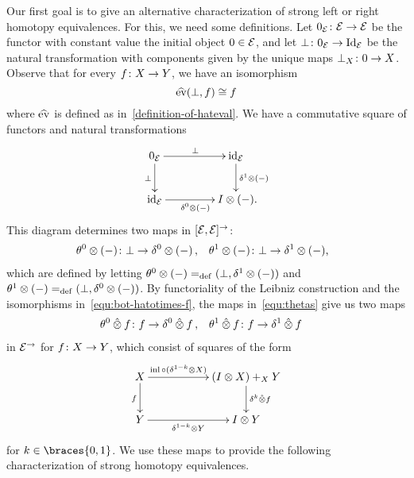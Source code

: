 \documentclass[reqno,10pt,a4paper,oneside,draft]{amsart}
\begin{document}
Our first goal is to give an alternative characterization of strong left or right homotopy equivalences.
For this, we need some definitions.
Let $0_{\mathcal{E}} \colon \mathcal{E} \to \mathcal{E}$ be the functor with constant value the initial object $0 \in \mathcal{E}$, and let $\bot \colon 0_{\mathcal{E}} \rightarrow \operatorname{Id}_{\mathcal{E}}$ be the natural transformation with components given by the unique maps $\bot_X \colon 0 \to X$.
Observe that for every $f \colon X \to Y$, we have an isomorphism
\begin{equation} \label{equ:bot-hatotimes-f}
\widehat{\operatorname{ev}}(\bot, f) \cong f
\end{equation}
where $\widehat{\operatorname{ev}}$ is defined as in~\eqref{definition-of-hateval}.
We have a commutative square of functors and natural transformations
\begin{equation} \label{the-trivial-square}
\begin{gathered}
\xymatrix@C+2em{
  0_\catE
  \ar[r]^{\bot}
  \ar[d]_{\bot}
&
  \id_\catE
  \ar[d]^{\rcyl \otimes (-)}
\\
  \id_\catE
  \ar[r]_{\lcyl \otimes (-)}
&
  \interval \otimes (-)
\rlap{.}}
\end{gathered}
\end{equation}
This diagram determines two maps in $[\mathcal{E}, \mathcal{E}]^\to$:
\begin{equation} \label{equ:thetas}
\begin{aligned}
  \thetal \otimes (-) &\co \bot \rightarrow \lcyl \otimes (-)
\, ,&
  \thetar \otimes (-) &\co \bot \rightarrow \rcyl \otimes (-)
\rlap{,}
\end{aligned}
\end{equation}
which are defined by letting $\theta^0 \otimes (-) =_{\operatorname{def}} (\bot, \delta^1 \otimes (-))$ and $\theta^1 \otimes (-) =_{\operatorname{def}} (\bot, \delta^0 \otimes (-))$.
By functoriality of the Leibniz construction and the isomorphisms in~\eqref{equ:bot-hatotimes-f}, the maps in~\eqref{equ:thetas} give us two maps
\begin{equation*}
\begin{aligned}
  \theta^0 \mathbin{\hat{\otimes}} f &\colon f \to \delta^0 \mathbin{\hat{\otimes}} f
\, ,&
  \theta^1 \mathbin{\hat{\otimes}} f &\colon f \to \delta^1 \mathbin{\hat{\otimes}} f
\end{aligned}
\end{equation*}
in $\mathcal{E}^\to$ for $f \colon X \to Y$, which consist of squares of the form
\[
\xymatrix@C+3em{
  X
  \ar[r]^-{\inl \cc (\kcylinv \otimes X)}
  \ar[d]_{f}
&
  (\interval \otimes X) +_X Y \ar[d]^{\kcyl \hatotimes f}
\\
  Y
  \ar[r]_-{\kcylinv \otimes Y}
&
  \interval \otimes Y
}
\]
for $k \in \braces{0, 1}$.
We use these maps to provide the following characterization of strong homotopy equivalences.
\end{document}
